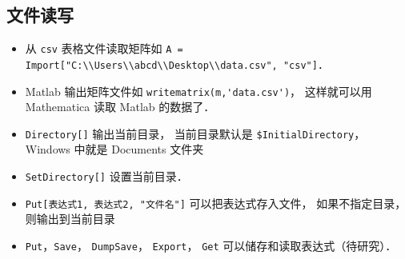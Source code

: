 \subsection{文件读写}
\begin{itemize}
\item 从 \verb|csv| 表格文件读取矩阵如 \verb|A = Import["C:\\Users\\abcd\\Desktop\\data.csv", "csv"]|．
\item Matlab 输出矩阵文件如 \verb|writematrix(m,'data.csv')|， 这样就可以用 Mathematica 读取 Matlab 的数据了．
\item \verb|Directory[]| 输出当前目录， 当前目录默认是 \verb|$InitialDirectory|， Windows 中就是 Documents 文件夹
\item \verb|SetDirectory[]| 设置当前目录．
\item \verb|Put[表达式1, 表达式2, "文件名"]| 可以把表达式存入文件， 如果不指定目录， 则输出到当前目录
\item \verb|Put|，\verb|Save|， \verb|DumpSave|， \verb|Export|， \verb|Get| 可以储存和读取表达式（待研究）．
\end{itemize}
